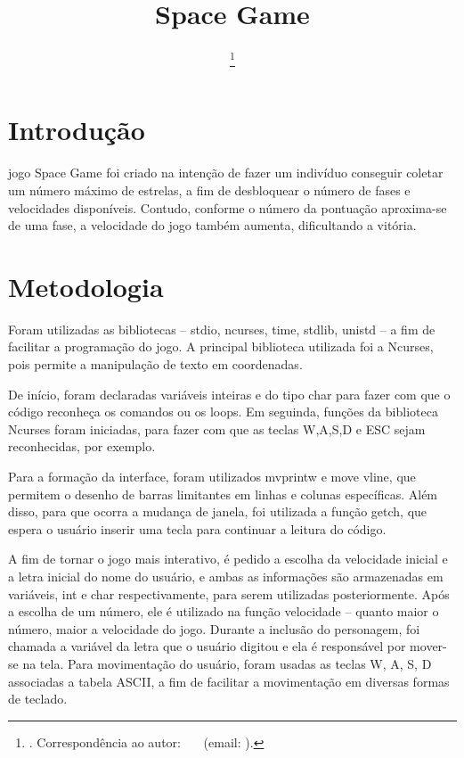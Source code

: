 \documentclass[journal]{IEEEtran}
\title                                                {Space Game}
\author{\IEEEauthorblockN{\prenomePrincipal~\nomedomeioPrincipal~\sobrenomePrincipal\IEEEauthorrefmark{1}}

\IEEEauthorblockA{\IEEEauthorrefmark{1}Universidade Federal de Santa Catarina (UFSC)}%
\thanks{\Revista. Correspond\^encia ao autor: \prenomePrincipal~\nomedomeioPrincipal~\sobrenomePrincipal~(email: \emailautor).}}
\begin{document}
\maketitle
\IEEEdisplaynontitleabstractindextext
\IEEEpeerreviewmaketitle


\section{Introdução}

 jogo Space Game foi criado na intenção de fazer um indivíduo conseguir coletar um número máximo de estrelas, a fim de desbloquear o número de fases e velocidades disponíveis. Contudo, conforme o número da pontuação aproxima-se de uma fase, a velocidade do jogo também aumenta, dificultando a vitória. 


\section{Metodologia}

Foram utilizadas as bibliotecas – stdio, ncurses, time, stdlib, unistd – a fim de facilitar a programação do jogo. A principal biblioteca utilizada foi a Ncurses, pois permite a manipulação de texto em coordenadas. 

De início, foram declaradas variáveis inteiras e do tipo char para fazer com que o código reconheça os comandos ou os loops.  Em seguinda, funções da biblioteca Ncurses foram iniciadas, para fazer com que as teclas W,A,S,D e ESC sejam reconhecidas, por exemplo. 

Para a formação da interface, foram utilizados mvprintw e move vline, que permitem o desenho de barras limitantes em linhas e colunas específicas. Além disso, para que ocorra a mudança de janela, foi utilizada a função getch, que espera o usuário inserir uma tecla para continuar a leitura do código. 

A fim de tornar o jogo mais interativo, é pedido a escolha da velocidade inicial e a letra inicial do nome do usuário, e ambas as informações são armazenadas em variáveis, int e char respectivamente, para serem utilizadas posteriormente. Após a escolha de um número, ele é utilizado na função velocidade – quanto maior o número, maior a velocidade do jogo. Durante a inclusão do personagem, foi chamada a variável da letra que o usuário digitou e ela é responsável por mover-se na tela. Para movimentação do usuário, foram usadas as teclas W, A, S, D associadas a tabela ASCII, a fim de facilitar a movimentação em diversas formas de teclado. 
\end{document}
